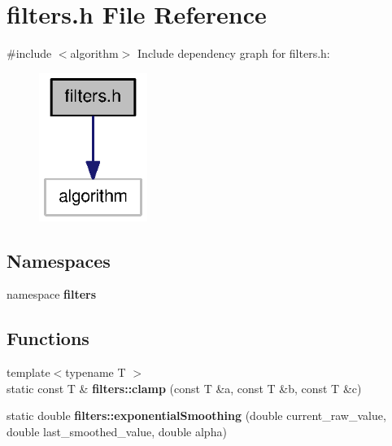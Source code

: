 \section{filters.\-h \-File \-Reference}
\label{filters_8h}
{\ttfamily \#include $<$algorithm$>$}\*
\-Include dependency graph for filters.\-h\-:
\nopagebreak
\begin{figure}[H]
\begin{center}
\leavevmode
\includegraphics[width=100pt]{filters_8h__incl}
\end{center}
\end{figure}
\subsection*{\-Namespaces}
\begin{DoxyCompactItemize}
\item 
namespace {\bf filters}
\end{DoxyCompactItemize}
\subsection*{\-Functions}
\begin{DoxyCompactItemize}
\item 
{\footnotesize template$<$typename T $>$ }\\static const \-T \& {\bf filters\-::clamp} (const \-T \&a, const \-T \&b, const \-T \&c)
\item 
static double {\bf filters\-::exponential\-Smoothing} (double current\-\_\-raw\-\_\-value, double last\-\_\-smoothed\-\_\-value, double alpha)
\end{DoxyCompactItemize}
